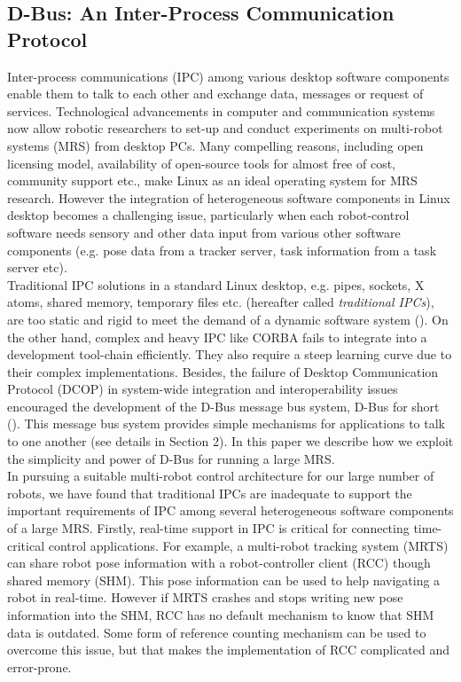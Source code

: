 \subsection{D-Bus: An Inter-Process Communication Protocol}
\label{expt-tools:dbus}
Inter-process communications (IPC) among various desktop software components enable them to talk to each other and exchange data, messages or request of services. Technological advancements in computer and communication systems now allow robotic researchers to set-up and conduct experiments on multi-robot systems (MRS) from desktop PCs. Many compelling reasons, including open licensing model, availability of open-source tools for almost free of cost, community support etc., make Linux as an ideal operating system for MRS research. However the integration of heterogeneous software components in Linux desktop becomes a challenging issue, particularly when each robot-control software needs sensory and other data input from various other software components (e.g. pose data from a tracker server, task information from a task server etc).\\ 
Traditional IPC solutions in a standard Linux desktop, e.g. pipes, sockets, X atoms, shared memory, temporary files etc. (hereafter called {\em traditional IPCs}), are too static and rigid to meet the demand of a dynamic software system (\cite{wittenburg2005}). On the other hand, complex and heavy IPC like CORBA fails to integrate into a development tool-chain efficiently. They also require a steep learning curve due to their complex implementations. Besides, the failure of Desktop Communication Protocol (DCOP) in system-wide integration and interoperability issues encouraged the development of the D-Bus message bus system, D-Bus for short (\cite{Pennington+2010}). This message bus system provides simple mechanisms for applications to talk to one another (see details in Section 2). In this paper we describe  how we exploit the simplicity and power of D-Bus  for running a large MRS.\\
In pursuing a suitable multi-robot control architecture for our large number of robots, we have found that traditional IPCs are inadequate to support the important requirements of IPC among several heterogeneous software components of a large MRS. Firstly, real-time support in IPC is critical for connecting time-critical control applications. For example, a multi-robot tracking system (MRTS) can share robot pose information with a robot-controller client (RCC) though shared memory (SHM). This pose information can be used to help navigating a robot in real-time. However if MRTS crashes and stops writing new pose information into the SHM, RCC has no default mechanism to know that SHM data is outdated. Some form of reference counting mechanism can be used to overcome this issue, but that makes the implementation of RCC complicated and error-prone.\\
